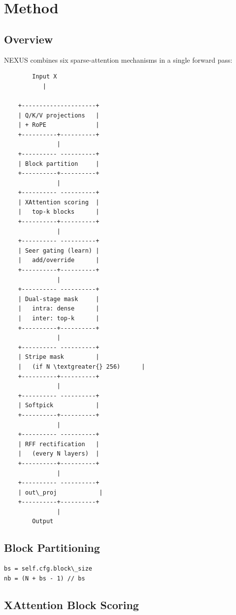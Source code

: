 \section{Method}

\subsection{Overview}

NEXUS combines six sparse-attention mechanisms in a single forward pass:

\begin{lstlisting}
        Input X
           |
            
    +---------------------+
    | Q/K/V projections   |
    | + RoPE              |
    +----------+----------+
               |
    +---------- ----------+
    | Block partition     |
    +----------+----------+
               |
    +---------- ----------+
    | XAttention scoring  |
    |   top-k blocks      |
    +----------+----------+
               |
    +---------- ----------+
    | Seer gating (learn) |
    |   add/override      |
    +----------+----------+
               |
    +---------- ----------+
    | Dual-stage mask     |
    |   intra: dense      |
    |   inter: top-k      |
    +----------+----------+
               |
    +---------- ----------+
    | Stripe mask         |
    |   (if N \textgreater{} 256)      |
    +----------+----------+
               |
    +---------- ----------+
    | Softpick            |
    +----------+----------+
               |
    +---------- ----------+
    | RFF rectification   |
    |   (every N layers)  |
    +----------+----------+
               |
    +---------- ----------+
    | out\_proj            |
    +----------+----------+
               |
        Output
\end{lstlisting}

\subsection{Block Partitioning}

\begin{lstlisting}
bs = self.cfg.block\_size
nb = (N + bs - 1) // bs
\end{lstlisting}

\subsection{XAttention Block Scoring}

